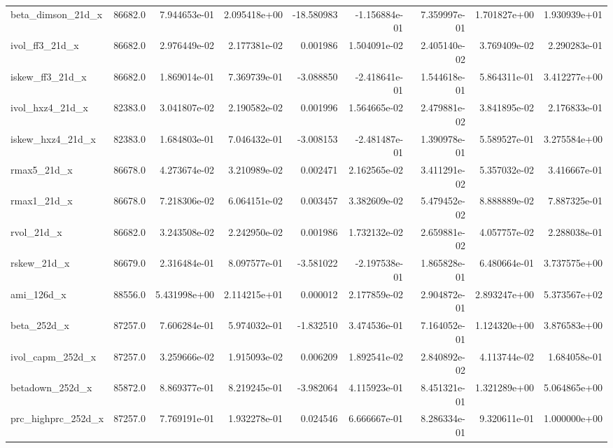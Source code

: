 \documentclass[10pt]{article}
\begin{document}
\begin{landscape}
\begin{longtable}{lrrrrrrrr}
beta\_dimson\_21d\_x       &   86682.0 &  7.944653e-01 &  2.095418e+00 &    -18.580983 & -1.156884e-01 &  7.359997e-01 &  1.701827e+00 &  1.930939e+01 \\
ivol\_ff3\_21d\_x          &   86682.0 &  2.976449e-02 &  2.177381e-02 &      0.001986 &  1.504091e-02 &  2.405140e-02 &  3.769409e-02 &  2.290283e-01 \\
iskew\_ff3\_21d\_x         &   86682.0 &  1.869014e-01 &  7.369739e-01 &     -3.088850 & -2.418641e-01 &  1.544618e-01 &  5.864311e-01 &  3.412277e+00 \\
ivol\_hxz4\_21d\_x         &   82383.0 &  3.041807e-02 &  2.190582e-02 &      0.001996 &  1.564665e-02 &  2.479881e-02 &  3.841895e-02 &  2.176833e-01 \\
iskew\_hxz4\_21d\_x        &   82383.0 &  1.684803e-01 &  7.046432e-01 &     -3.008153 & -2.481487e-01 &  1.390978e-01 &  5.589527e-01 &  3.275584e+00 \\
rmax5\_21d\_x             &   86678.0 &  4.273674e-02 &  3.210989e-02 &      0.002471 &  2.162565e-02 &  3.411291e-02 &  5.357032e-02 &  3.416667e-01 \\
rmax1\_21d\_x             &   86678.0 &  7.218306e-02 &  6.064151e-02 &      0.003457 &  3.382609e-02 &  5.479452e-02 &  8.888889e-02 &  7.887325e-01 \\
rvol\_21d\_x              &   86682.0 &  3.243508e-02 &  2.242950e-02 &      0.001986 &  1.732132e-02 &  2.659881e-02 &  4.057757e-02 &  2.288038e-01 \\
rskew\_21d\_x             &   86679.0 &  2.316484e-01 &  8.097577e-01 &     -3.581022 & -2.197538e-01 &  1.865828e-01 &  6.480664e-01 &  3.737575e+00 \\
ami\_126d\_x              &   88556.0 &  5.431998e+00 &  2.114215e+01 &      0.000012 &  2.177859e-02 &  2.904872e-01 &  2.893247e+00 &  5.373567e+02 \\
beta\_252d\_x             &   87257.0 &  7.606284e-01 &  5.974032e-01 &     -1.832510 &  3.474536e-01 &  7.164052e-01 &  1.124320e+00 &  3.876583e+00 \\
ivol\_capm\_252d\_x        &   87257.0 &  3.259666e-02 &  1.915093e-02 &      0.006209 &  1.892541e-02 &  2.840892e-02 &  4.113744e-02 &  1.684058e-01 \\
betadown\_252d\_x         &   85872.0 &  8.869377e-01 &  8.219245e-01 &     -3.982064 &  4.115923e-01 &  8.451321e-01 &  1.321289e+00 &  5.064865e+00 \\
prc\_highprc\_252d\_x      &   87257.0 &  7.769191e-01 &  1.932278e-01 &      0.024546 &  6.666667e-01 &  8.286334e-01 &  9.320611e-01 &  1.000000e+00 \\

\end{longtable}
\end{landscape}
\end{document}
